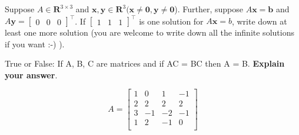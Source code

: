 \documentclass[solution,addpoints,12pt]{exam}
\begin{document}
\begin{questions}
\question[2] Suppose $A \in \mathbf{R}^{3 \times 3}$ and $\mathbf{x}, \mathbf{y} \in \mathbf{R}^{3} (\mathbf{x} \neq \mathbf{0}, \mathbf{y} \neq \mathbf{0}$). Further, suppose $A\mathbf{x} = \mathbf{b}$ and $A\mathbf{y} = \begin{bmatrix} 0 & 0 & 0\end{bmatrix}^\top$. If $\begin{bmatrix} 1 & 1 & 1\end{bmatrix}^\top$ is one solution for $A\mathbf{x} = b$, write down at least one more solution (you are welcome to write down all the infinite solutions if you want :-) ).  
\begin{solution}
\end{solution}

\question[1] True or False: If A, B, C are matrices and if AC = BC then A = B. \textbf{Explain your answer}.
\begin{solution}
\end{solution}

\question 

$$A = \begin{bmatrix}
1 & 0 & 1 & -1 \\
2 & 2 & 2 & 2 \\
3 & -1 & -2 & -1 \\
1 & 2 & -1 & 0 \\
\end{bmatrix}$$

\begin{solution}
\end{solution}


\end{questions}
\end{document}
